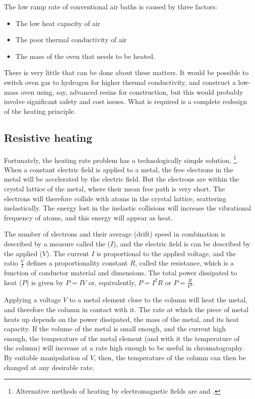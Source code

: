 The low ramp rate of conventional air baths is caused by three factors:

\begin{itemize}
	\item The low heat capacity of air
	\item The poor thermal conductivity of air
	\item The mass of the oven that needs to be heated. 
\end{itemize}

There is very little that can be done about these matters. It would be possible
to switch oven gas to hydrogen for higher thermal conductivity, and construct a
low-mass oven using, say, advanced resins for construction, but this would
probably involve significant safety and cost issues. What is required is a
complete redesign of the heating principle.

\subsection{Resistive heating}

Fortunately, the heating rate problem has a technologically simple solution,
\footnote{Alternative methods of heating by
electromagnetic fields are  and .}. When a constant electric field is applied to a metal, the free electrons in
the metal will be accelerated by the electric field. But the electrons are
within the crystal lattice of the metal, where their mean free path is very
short. The electrons will therefore collide with atoms in the crystal lattice,
scattering inelastically. The energy lost in the inelastic collisions will
increase the vibrational frequency of atoms, and this energy will appear as
heat.

The number of electrons and their average (drift) speed in combination is
described by a measure called the  ($I$), and the electric field
is can be described by the applied  ($V$). The current $I$ is
proportional to the applied voltage, and the ratio $\frac{V}{I}$ defines a
proportionality constant $R$, called the resistance, which is a function of
conductor material and dimensions. The total power dissipated to heat ($P$) is
given by $P=IV$ or, equivalently, $P=I^2R$ or $P=\frac{R}{V^2}$.

Applying a voltage \(V\) to a metal element close to the column will heat the
metal, and therefore the column in contact with it. The rate at which the piece
of metal heats up depends on the power dissipated, the mass of the metal, and
its heat capacity. If the volume of the metal is small enough, and the current
high enough, the temperature of the metal element (and with it the temperature
of the column) will increase at a rate high enough to be useful in
chromatography. By suitable manipulation of \(V\), then, the temperature of the
column can then be changed at any desirable rate.

